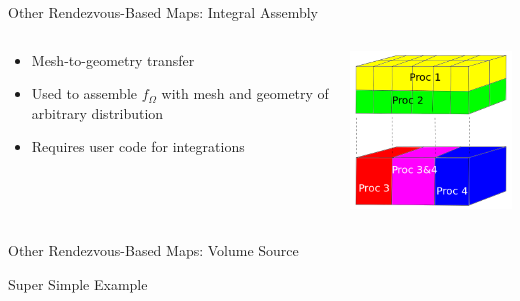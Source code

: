 \documentclass{beamer}
\begin{document}
\begin{frame}{Other Rendezvous-Based Maps: Integral Assembly}

  \begin{columns}
    
    \begin{column}{0.5\textwidth}
      \begin{itemize}
      \item Mesh-to-geometry transfer
      \item Used to assemble $f_{\Omega}$ with mesh and geometry of
        arbitrary distribution
        \medskip
      \item Requires user code for integrations
        \medskip
      \end{itemize}
    \end{column}

    \begin{column}{0.5\textwidth}
      \centering
      \includegraphics[width=2.4in]{integral_assembly.png}
    \end{column}

  \end{columns}

\end{frame}

\begin{frame}{Other Rendezvous-Based Maps: Volume Source}

\end{frame}

\begin{frame}{Super Simple Example}

\end{frame}

\end{document}

